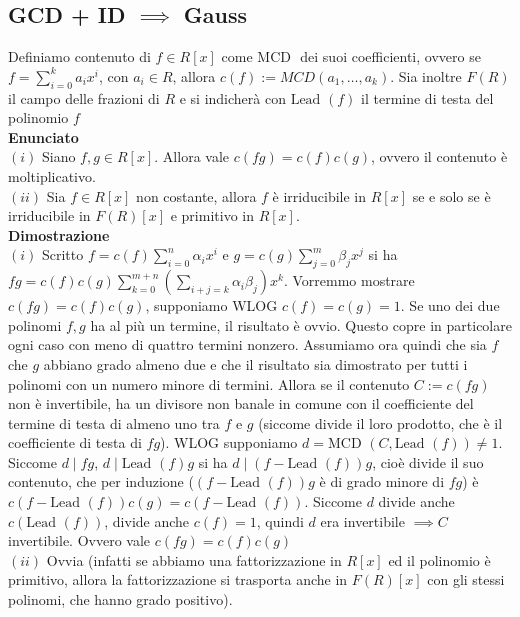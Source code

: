 \documentclass[a4paper,GeneralMath,NoNotes]{stdmdoc}
\newcommand{\Enunciato}{\vskip 0.05cm \noindent \textbf{Enunciato} \\ }
\renewcommand{\Dimostrazione}{\vskip 0.05cm \noindent \textbf{Dimostrazione} \\ }
\newcommand{\frsx}{ \framebox[\width]{ $\Leftarrow$ } }
\newcommand{\MCD}{\text{MCD }}
\newcommand{\Lead}{\text{Lead }}
\begin{document}
	\subsection{GCD + ID $\implies$ Gauss}
	Definiamo contenuto di $f \in R[x]$ come $\MCD$ dei suoi coefficienti, ovvero se $f = \sum_{i=0}^{k} a_i x^i$, con $a_i \in R$, allora $c(f) := MCD(a_1, \ldots, a_k)$. Sia inoltre $F(R)$ il campo delle frazioni di $R$ e si indicherà con $\Lead(f)$ il termine di testa del polinomio $f$ \\
	\Enunciato
		$(i)$ Siano $f, g \in R[x]$. Allora vale $c(fg) = c(f) c(g)$, ovvero il contenuto è moltiplicativo. \\
		$(ii)$ Sia $f \in R[x]$ non costante, allora $f$ è irriducibile in $R[x]$ se e solo se è irriducibile in $F(R)[x]$ e primitivo in $R[x]$. \\
	\Dimostrazione
		$(i)$ Scritto $f = c(f) \sum_{i=0}^{n} \alpha_i x^i$ e $g = c(g) \sum_{j=0}^{m} \beta_j x^j$ si ha $fg = c(f) c(g) \sum_{k = 0}^{m+n} ( \sum_{i + j = k} \alpha_i \beta_j ) x^k$. Vorremmo mostrare $c(fg) = c(f)c(g)$, supponiamo WLOG $c(f) = c(g) = 1$. Se uno dei due polinomi $f, g$ ha al più un termine, il risultato è ovvio. Questo copre in particolare ogni caso con meno di quattro termini nonzero. Assumiamo ora quindi che sia $f$ che $g$ abbiano grado almeno due e che il risultato sia dimostrato per tutti i polinomi con un numero minore di termini. Allora se il contenuto $C := c(fg)$ non è invertibile, ha un divisore non banale in comune con il coefficiente del termine di testa di almeno uno tra $f$ e $g$ (siccome divide il loro prodotto, che è il coefficiente di testa di $fg$). WLOG supponiamo $d = \MCD(C,\Lead(f)) \neq 1$. Siccome $d \mid fg$, $d \mid \Lead(f)g$ si ha $d \mid (f - \Lead(f))g$, cioè divide il suo contenuto, che per induzione ($(f - \Lead(f))g$ è di grado minore di $fg$) è $c(f - \Lead(f))c(g) = c(f - \Lead(f))$. Siccome $d$ divide anche $c(\Lead(f))$, divide anche $c(f) = 1$, quindi $d$ era invertibile $\implies C$ invertibile. Ovvero vale $c(fg) = c(f)c(g)$ \\
		$(ii)$ \frsx Ovvia (infatti se abbiamo una fattorizzazione in $R[x]$ ed il polinomio è primitivo, allora la fattorizzazione si trasporta anche in $F(R)[x]$ con gli stessi polinomi, che hanno grado positivo). \\
\end{document}
